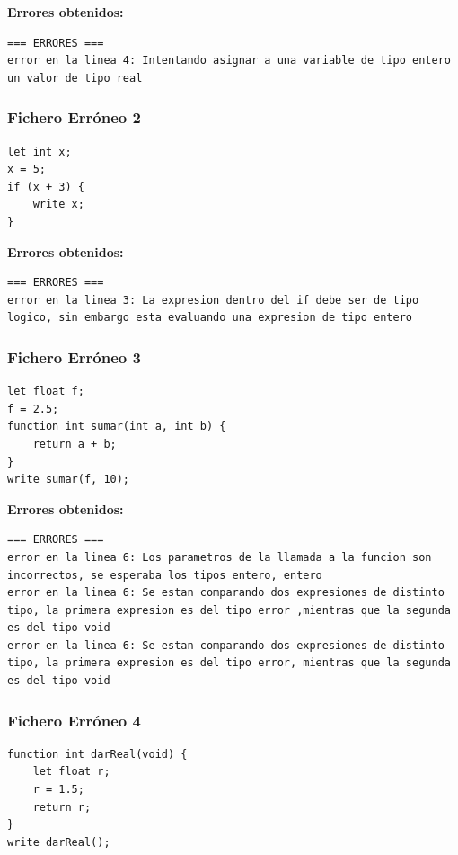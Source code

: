 \documentclass{article}
\begin{document}
\textbf{Errores obtenidos:}
\begin{lstlisting}
=== ERRORES ===
error en la linea 4: Intentando asignar a una variable de tipo entero un valor de tipo real
\end{lstlisting}

\subsubsection{Fichero Erróneo 2}
\begin{lstlisting}[title={fichero2\_erroneo.txt}]
let int x;
x = 5;
if (x + 3) {
    write x;
}
\end{lstlisting}

\textbf{Errores obtenidos:}
\begin{lstlisting}
=== ERRORES ===
error en la linea 3: La expresion dentro del if debe ser de tipo logico, sin embargo esta evaluando una expresion de tipo entero
\end{lstlisting}

\subsubsection{Fichero Erróneo 3}
\begin{lstlisting}[title={fichero3\_erroneo.txt}]
let float f;
f = 2.5;
function int sumar(int a, int b) {
    return a + b;
}
write sumar(f, 10);
\end{lstlisting}

\textbf{Errores obtenidos:}
\begin{lstlisting}
=== ERRORES ===
error en la linea 6: Los parametros de la llamada a la funcion son incorrectos, se esperaba los tipos entero, entero
error en la linea 6: Se estan comparando dos expresiones de distinto tipo, la primera expresion es del tipo error ,mientras que la segunda es del tipo void
error en la linea 6: Se estan comparando dos expresiones de distinto tipo, la primera expresion es del tipo error, mientras que la segunda es del tipo void
\end{lstlisting}

\subsubsection{Fichero Erróneo 4}
\begin{lstlisting}[title={fichero4\_erroneo.txt}]
function int darReal(void) {
    let float r;
    r = 1.5;
    return r;
}
write darReal();
\end{lstlisting}
\end{document}
